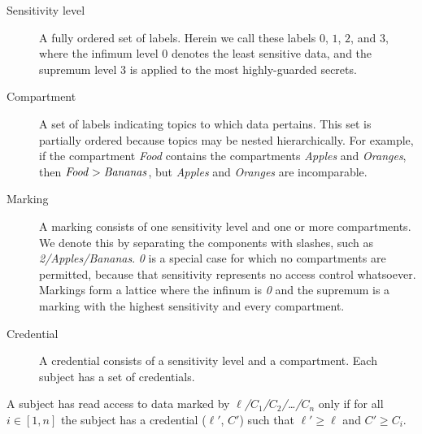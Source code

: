 \documentclass[twocolumn]{article}
\begin{document}
\begin{description}

  \item[Sensitivity level] A fully ordered set of labels. Herein we call these labels $0$, $1$, $2$, and $3$, where the infimum level $0$ denotes the least sensitive data, and the supremum level $3$ is applied to the most highly-guarded secrets.

  \item[Compartment] A set of labels indicating topics to which data pertains. This set is partially ordered because topics may be nested hierarchically. For example, if the compartment {\it Food} contains the compartments {\it Apples} and {\it Oranges}, then ${\it Food} > {\it Bananas}$, but {\it Apples} and {\it Oranges} are incomparable.

  \item[Marking] A marking consists of one sensitivity level and one or more compartments. We denote this by separating the components with slashes, such as {\it 2/Apples/Bananas}. {\it 0} is a special case for which no compartments are permitted, because that sensitivity represents no access control whatsoever. Markings form a lattice where the infinum is {\it 0} and the supremum is a marking with the highest sensitivity and every compartment.

  \item[Credential] A credential consists of a sensitivity level and a compartment. Each subject has a set of credentials.

\end{description}

A subject has read access to data marked by {\it $\ell$/$C_1$/$C_2$/\ldots/$C_n$} only if for all $i \in [1, n]$ the subject has a credential ($\ell'$, $C'$) such that $\ell' \ge \ell$ and $C' \ge C_i$.
\end{document}
